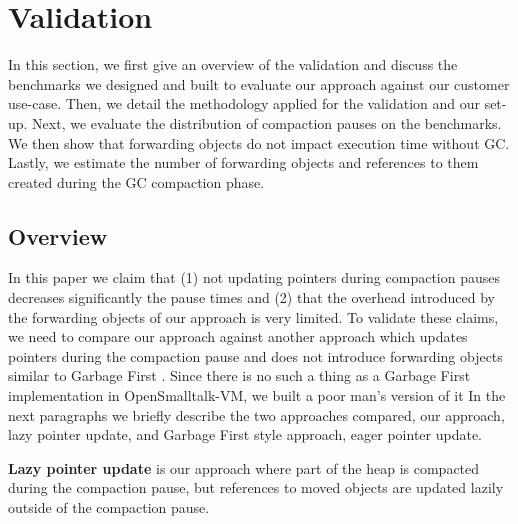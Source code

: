 \documentclass[sigplan,10pt,screen]{acmart}\settopmatter{printfolios=true,printccs=true,printacmref=true}
\newcommand{\egb}[1]{\color{blue}\fbox{\bfseries\sffamily\scriptsize Elisa:}{\sf\small$\blacktriangleright$\textit{#1}$\blacktriangleleft$}\color{black}}
\def\OpenSmalltalkVM{OpenSmalltalk-VM\xspace}
\begin{document}
\section{Validation}
\label{sec:validation}

In this section, we first give an overview of the validation and discuss the benchmarks we designed and built to evaluate our approach against our customer use-case. Then, we detail the methodology applied for the validation and our set-up. Next, we evaluate the distribution of compaction pauses on the benchmarks. We then show that forwarding objects do not impact execution time without GC. Lastly, we estimate the number of forwarding objects and references to them created during the GC compaction phase.

\subsection{Overview}
\label{sec:ow}

In this paper we claim that (1) not updating pointers during compaction pauses decreases significantly the pause times and (2) that the overhead introduced by the forwarding objects of our approach is very limited. To validate these claims, we need to compare our approach against another approach which updates pointers during the compaction pause and does not introduce forwarding objects similar to Garbage First \cite{G1}. 
Since there is no such a thing as a Garbage First implementation in \OpenSmalltalkVM, we built a poor man's version of it
In the next paragraphs we briefly describe the two approaches compared, our approach, %
lazy pointer update, and %
Garbage First style approach, %
eager pointer update.

\textbf{Lazy pointer update} is our approach where part of the heap is compacted during the compaction pause, but references to moved objects are updated lazily outside of the compaction pause. 
\end{document}
